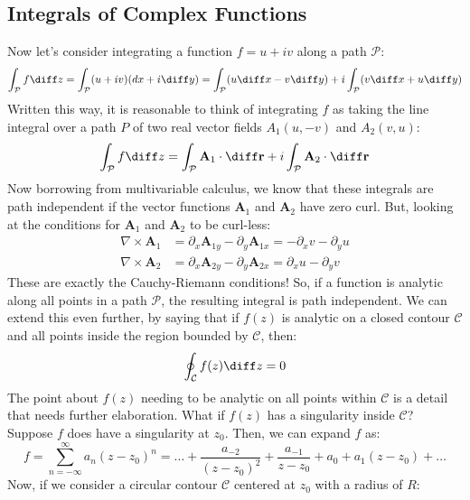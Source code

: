 \subsection{Integrals of Complex Functions}
Now let's consider integrating a function \( f = u + iv \) along a path \( \mathcal{P} \):
\[
	\int_{\mathcal{P}} f \diff z = \int_{\mathcal{P}} (u + iv) (dx + i \diff y) = \int_{\mathcal{P}}(u \diff
	x - v \diff y) + i\int_{\mathcal{P}} (v \diff x + u \diff y)
\]
Written this way, it is reasonable to think of integrating \( f \) as taking the line integral over a path \(
P\) of two real vector fields \( A_1(u, -v) \) and \( A_2(v, u) \): 
\[
	\int_{\mathcal{P}}f \diff z = \int_{\mathcal{P}}\mathbf{A}_1 \cdot \diff \mathbf{r} + i \int_{\mathcal{P}}
	\mathbf{A}_2 \cdot \diff \mathbf{r}
\]
Now borrowing from multivariable calculus, we know that these integrals are path independent if the vector
functions \( \mathbf{A}_1 \) and \( \mathbf{A}_2 \) have zero curl. But, looking at the conditions for
\( \mathbf{A}_1 \) and \( \mathbf{A}_2 \) to be curl-less:
\begin{align*}
	\nabla \times \mathbf{A}_1 &= \partial_x \mathbf{A}_{1y} - \partial_y \mathbf{A}_{1x} = -\partial_x v -
	\partial_y u\\
	\nabla \times \mathbf{A}_2 &= \partial_x \mathbf{A}_{2y} - \partial_y \mathbf{A}_{2x} 
	= \partial_x u - \partial_y v 
\end{align*}
These are exactly the Cauchy-Riemann conditions! So, if a function is analytic along all points in a path \(
\mathcal{P}\), the resulting integral is path independent. We can extend this even further, by saying that if
\( f(z) \) is analytic on a closed contour \( \mathcal{C} \) and all points inside the region bounded by \(
\mathcal{C} \), then:
\[
	\oint_{\mathcal{C}}f(z) \diff z = 0
\]
The point about \( f(z) \) needing to be analytic on all points within \( \mathcal{C} \) is a detail that
needs further elaboration. What if \( f(z) \) has a singularity inside \( \mathcal{C} \)? Suppose \( f \)
does have a singularity at \( z_0 \). Then, we can expand \( f \) as:
\[
	f = \sum_{n = -\infty}^{\infty} a_n (z - z_0)^{n} = \dots + \frac{a_{-2}}{(z - z_0)^2} + \frac{a_{-1}}{z
	- z_0} + a_0 + a_1 (z - z_0) + \dots 
\]
Now, if we consider a circular contour \( \mathcal{C} \) centered at \( z_0 \) with a radius of \( R \):


